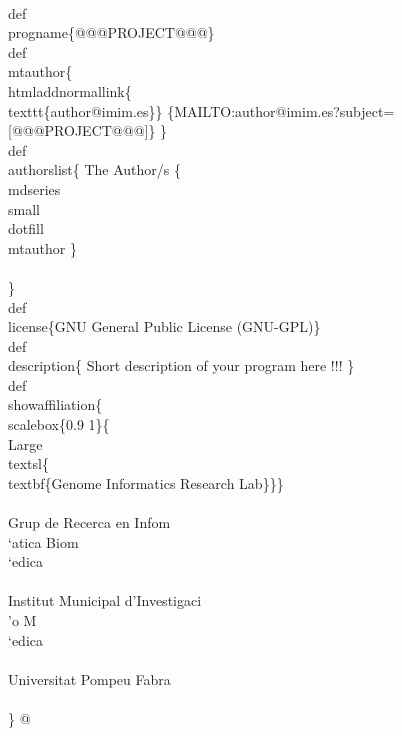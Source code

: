 \documentclass[11pt]{article}
\def\nwendcode{\endtrivlist \endgroup} %
\let\nwdocspar=\par                    %
\begin{document}
%
\\def\\progname\{@@@PROJECT@@@\}
\\def\\mtauthor\{
 \\htmladdnormallink\{\\texttt\{author@imim.es\}\}
                   \{MAILTO:author@imim.es?subject=[@@@PROJECT@@@]\}
 \} %
\\def\\authorslist\{
 The Author/s \{\\mdseries\\small\\dotfill \\mtauthor \} \\\\
 \} %
\\def\\license\{GNU General Public License (GNU-GPL)\}
\\def\\description\{
Short description of your program here !!!
 \} %
\\def\\showaffiliation\{
\\scalebox\{0.9 1\}\{\\Large\\textsl\{\\textbf\{Genome Informatics Research Lab\}\}\}\\\\
Grup de Recerca en Infom\\`atica Biom\\`edica\\\\
Institut Municipal d'Investigaci\\'o M\\`edica\\\\
Universitat Pompeu Fabra\\\\[2ex]
 \} %
%
@
\nwendcode{}\nwdocspar
\end{document}
